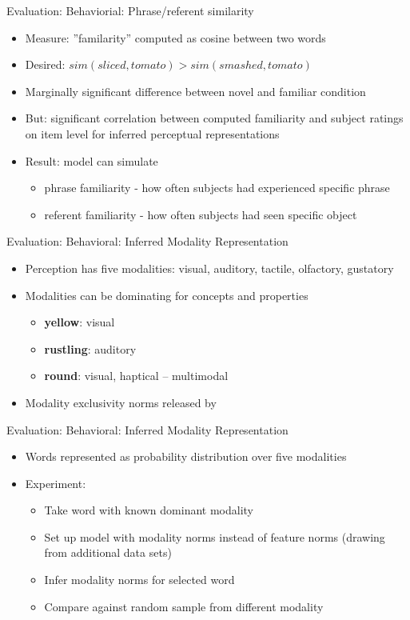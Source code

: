 \documentclass[12pt,a4paper]{beamer}
\begin{document}
\begin{frame}{Evaluation: Behaviorial: Phrase/referent similarity}
\begin{itemize}
\item Measure: ''familarity'' computed as cosine between two words
\item Desired: $sim(sliced,tomato) > sim(smashed,tomato)$
\item Marginally significant difference between novel and familiar condition
\item But: significant correlation between computed familiarity and subject ratings on item level for inferred perceptual representations
\item Result: model can simulate
    \begin{itemize}
    \item phrase familiarity - how often subjects had experienced specific phrase
    \item referent familiarity - how often subjects had seen specific object
    \end{itemize}
\end{itemize}
\end{frame}

\begin{frame}{Evaluation: Behavioral: Inferred Modality Representation}
\begin{itemize}
\item Perception has five modalities: visual, auditory, tactile, olfactory, gustatory
\item Modalities can be dominating for concepts and properties
\begin{itemize}
    \item \textbf{yellow}: visual
    \item \textbf{rustling}: auditory
    \item \textbf{round}: visual, haptical -- multimodal
\end{itemize}
\item Modality exclusivity norms released by \cite{lynott} 
\end{itemize}
\end{frame}

\begin{frame}{Evaluation: Behavioral: Inferred Modality Representation}
\begin{itemize}
\item Words represented as probability distribution over five modalities
\item Experiment:
    \begin{itemize}
    \item Take word with known dominant modality
    \item Set up model with modality norms instead of feature norms (drawing from additional data sets)
    \item Infer modality norms for selected word
    \item Compare against random sample from different modality
    \end{itemize}
\end{itemize}
\end{frame}
\end{document}
